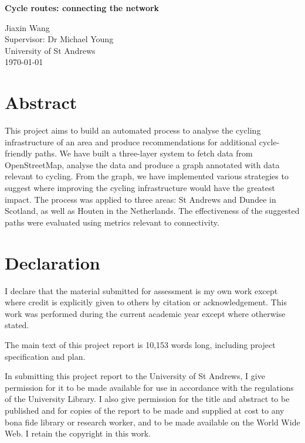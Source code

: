 \documentclass[12pt,a4paper]{report}
\begin{document}
\pagestyle{empty}

\vspace*{60mm}
\begin{center}
\Huge
\textbf{Cycle routes: connecting the network}

\vfill
\large
Jiaxin Wang \\[3mm]
Supervisor: Dr Michael Young \\[3mm]
University of St Andrews \\[3mm]
\today  %
\end{center}
\thispagestyle{empty}

\pagestyle{plain}
\chapter*{Abstract}
This project aims to build an automated process to analyse the cycling infrastructure of an area and produce recommendations for additional cycle-friendly paths. We have built a three-layer system to fetch data from OpenStreetMap, analyse the data and produce a graph annotated with data relevant to cycling. From the graph, we have implemented various strategies to suggest where improving the cycling infrastructure would have the greatest impact. The process was applied to three areas: St Andrews and Dundee in Scotland, as well as Houten in the Netherlands. The effectiveness of the suggested paths were evaluated using metrics relevant to connectivity.

\chapter*{Declaration}
I declare that the material submitted for assessment is my own work except where credit is explicitly given to others by citation or acknowledgement. This work was performed during the current academic year except where otherwise stated.

The main text of this project report is 10,153 words long, including project specification and plan.

In submitting this project report to the University of St Andrews, I give permission for it to be made available for use in accordance with the regulations of the University Library. I also give permission for the title and abstract to be published and for copies of the report to be made and supplied at cost to any bona fide library or research worker, and to be made available on the World Wide Web. I retain the copyright in this work.
\end{document}
